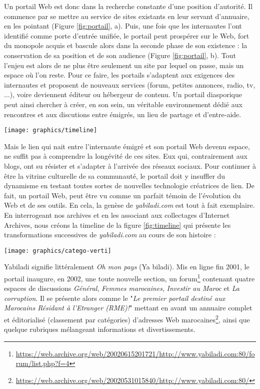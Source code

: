 \documentclass[symmetric,justified,marginals=raggedouter]{tufte-book}
\begin{document}
\noindent Un portail Web est donc dans la recherche constante d'une position d'autorité. Il commence par se mettre au service de sites existants en leur servant d'annuaire, en les pointant (Figure \ref{fig:portail}, a). Puis, une fois que les internautes l'ont identifié comme porte d'entrée unifiée, le portail peut prospérer sur le Web, fort du monopole acquis et bascule alors dans la seconde phase de son existence : la conservation de sa position et de son audience (Figure \ref{fig:portail}, b). Tout l'enjeu est alors de ne plus être seulement un site par lequel on passe, mais un espace où l'on reste. Pour ce faire, les portails s'adaptent aux exigences des internautes et proposent de nouveaux services (forum, petites annonces, radio, tv, ...), voire deviennent éditeur ou hébergeur de contenu. Un portail diasporique peut ainsi chercher à créer, en son sein, un véritable environnement dédié aux rencontres et aux discutions entre émigrés, un lieu de partage et d'entre-aide.  

\begin{figure*}
  \texttt{[image: graphics/timeline]}
  \caption{Timeline des évolutions successives de \textit{yabiladi.com}}
  \label{fig:timeline}
\end{figure*}

\noindent Mais le lien qui nait entre l'internaute émigré et son portail Web devenu espace, ne suffit pas à comprendre la longévité de ces sites. Eux qui, contrairement aux blogs, ont su résister et s'adapter à l'arrivée des réseaux sociaux. Pour continuer à être la vitrine culturelle de sa communauté, le portail doit y insuffler du dynamisme en testant toutes sortes de nouvelles technologie créatrices de lien. De fait, un portail Web, peut être vu comme un parfait témoin de l'évolution du Web et de ses outils. En cela, la genèse de \textit{yabiladi.com} est tout à fait exemplaire. En interrogeant nos archives et en les associant aux collectages d'Internet Archives, nous créons la timeline de la figure \ref{fig:timeline} qui présente les transformations successives de \textit{yabiladi.com} au cours de son histoire : 

\begin{figure*}[hbtp]%
  \texttt{[image: graphics/catego-verti]}
  \caption{Évolution des catégories du forum de \textit{yabiladi.com}, par date d'apparition}
  \label{fig:categories}
\end{figure*}


Yabiladi signifie littéralement \textit{Oh mon pays} (Ya biladi). Mis en ligne fin 2001, le portail inaugure, en 2002, une toute nouvelle section, un forum\footnote{\url{https://web.archive.org/web/20020615201721/http://www.yabiladi.com:80/forum/list.php?f=4}} contenant quatre espaces de discussions \textit{Général}, \textit{Femmes marocaines}, \textit{Investir au Maroc} et \textit{La corruption}. Il se présente alors comme le "\textit{Le premier portail destiné aux Marocains Résidant à l'Etranger (RME)!}" mettant en avant un annuaire complet et éditorialisé (classement par catégories) d'adresses Web marocaines\footnote{\url{https://web.archive.org/web/20020531015840/http://www.yabiladi.com:80/}}, ainsi que quelque rubriques mélangeant informations et divertissements. 
\end{document}
